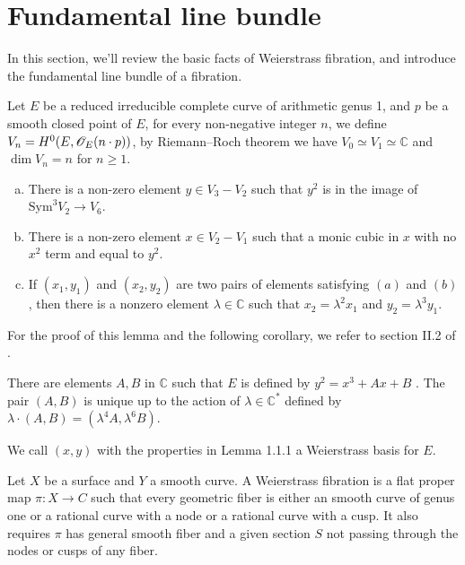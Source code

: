\section{Fundamental line bundle}
In this section, we'll review the basic facts of Weierstrass fibration, and introduce the fundamental line bundle of a fibration.\\ \indent
\begin{defi}
Let $E$ be a reduced irreducible complete curve of arithmetic genus 1, and $p$ be a smooth closed point of $E$, for every non-negative integer $n$, we define $V_n=H^0(E,\mathscr{O}_E(n\cdot p))$, by Riemann--Roch theorem we have $V_0\simeq V_1\simeq \mathbb{C}$ and $\dim V_n=n$ for $n\geq 1$.
\end{defi}
\begin{lemm}
\begin{enumerate}[(a)]
\item There is a non-zero element $y\in V_3-V_2$ such that $y^2$ is in the image of $\textrm{Sym}^3V_2\rightarrow V_6$.
\item There is a non-zero element $x\in V_2-V_1$ such that a monic cubic in $x$ with no $x^2$ term and equal to $y^2$.
\item  If $(x_1,y_1)$ and $(x_2,y_2)$ are two pairs of elements satisfying $(a)$ and $(b)$, then there is a nonzero element $\lambda\in\mathbb{C}$ such that $x_2=\lambda^2x_1$ and $y_2=\lambda^3y_1$.
\end{enumerate}
\end{lemm}
For the proof of this lemma and the following corollary, we refer to section II.2 of \cite{miranda1989basic}.
\begin{coro}
There are elements $A,B$ in $\mathbb{C}$  such that $E$ is defined by $y^2=x^3+Ax+B$ . The pair $(A,B)$ is unique up to the action of $\lambda\in \mathbb{C}^*$ defined by $\lambda\cdot(A,B)=(\lambda^4 A,\lambda^6 B)$.
\end{coro}
\begin{defi}
We call $(x,y)$ with the properties in Lemma 1.1.1 a Weierstrass basis for $E$.
\end{defi} 
\begin{defi}
Let $X$ be a surface and $Y$ a smooth curve. A Weierstrass fibration is a flat proper map $\pi\colon X\rightarrow C$ such that every geometric fiber is either an smooth curve of genus one or a rational curve with a node or a rational curve with a cusp. It also requires $\pi$ has general smooth fiber and a given section $S$ not passing through the nodes or cusps of any fiber.
\end{defi}
